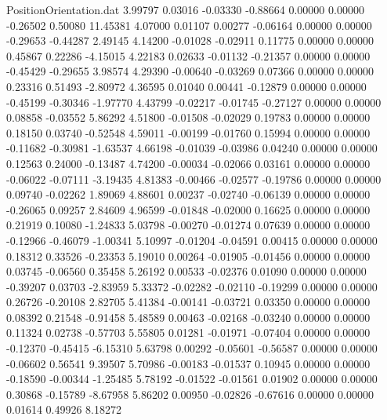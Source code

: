\begin{filecontents}{PositionOrientation.dat}
   3.99797    0.03016   -0.03330    -0.88664    0.00000    0.00000   -0.26502    0.50080   11.45381
   4.07000    0.01107    0.00277    -0.06164    0.00000    0.00000   -0.29653   -0.44287    2.49145
   4.14200   -0.01028   -0.02911     0.11775    0.00000    0.00000    0.45867    0.22286   -4.15015
   4.22183    0.02633   -0.01132    -0.21357    0.00000    0.00000   -0.45429   -0.29655    3.98574
   4.29390   -0.00640   -0.03269     0.07366    0.00000    0.00000    0.23316    0.51493   -2.80972
   4.36595    0.01040    0.00441    -0.12879    0.00000    0.00000   -0.45199   -0.30346   -1.97770
   4.43799   -0.02217   -0.01745    -0.27127    0.00000    0.00000    0.08858   -0.03552    5.86292
   4.51800   -0.01508   -0.02029     0.19783    0.00000    0.00000    0.18150    0.03740   -0.52548
   4.59011   -0.00199   -0.01760     0.15994    0.00000    0.00000   -0.11682   -0.30981   -1.63537
   4.66198   -0.01039   -0.03986     0.04240    0.00000    0.00000    0.12563    0.24000   -0.13487
   4.74200   -0.00034   -0.02066     0.03161    0.00000    0.00000   -0.06022   -0.07111   -3.19435
   4.81383   -0.00466   -0.02577    -0.19786    0.00000    0.00000    0.09740   -0.02262    1.89069
   4.88601    0.00237   -0.02740    -0.06139    0.00000    0.00000   -0.26065    0.09257    2.84609
   4.96599   -0.01848   -0.02000     0.16625    0.00000    0.00000    0.21919    0.10080   -1.24833
   5.03798   -0.00270   -0.01274     0.07639    0.00000    0.00000   -0.12966   -0.46079   -1.00341
   5.10997   -0.01204   -0.04591     0.00415    0.00000    0.00000    0.18312    0.33526   -0.23353
   5.19010    0.00264   -0.01905    -0.01456    0.00000    0.00000    0.03745   -0.06560    0.35458
   5.26192    0.00533   -0.02376     0.01090    0.00000    0.00000   -0.39207    0.03703   -2.83959
   5.33372   -0.02282   -0.02110    -0.19299    0.00000    0.00000    0.26726   -0.20108    2.82705
   5.41384   -0.00141   -0.03721     0.03350    0.00000    0.00000    0.08392    0.21548   -0.91458
   5.48589    0.00463   -0.02168    -0.03240    0.00000    0.00000    0.11324    0.02738   -0.57703
   5.55805    0.01281   -0.01971    -0.07404    0.00000    0.00000   -0.12370   -0.45415   -6.15310
   5.63798    0.00292   -0.05601    -0.56587    0.00000    0.00000   -0.06602    0.56541    9.39507
   5.70986   -0.00183   -0.01537     0.10945    0.00000    0.00000   -0.18590   -0.00344   -1.25485
   5.78192   -0.01522   -0.01561     0.01902    0.00000    0.00000    0.30868   -0.15789   -8.67958
   5.86202    0.00950   -0.02826    -0.67616    0.00000    0.00000    0.01614    0.49926    8.18272

\end{filecontents}

